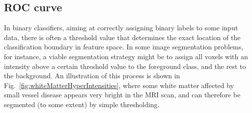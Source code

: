 \documentclass[10pt,twoside]{book}
\begin{document}
\subsection{ROC curve}

In binary classifiers, aiming at correctly assigning binary labels to some input data, there is often a threshold value that determines
the exact location of the classification boundary in feature space. In some image segmentation problems, for instance, a viable segmentation 
strategy might be to assign all voxels with an intensity above a certain threshold value to the foreground class, and the rest to the background. 
An illustration of this process is shown in Fig.~\ref{fig:whiteMatterHyperIntensities}, where some white matter affected by small vessel disease appears very bright 
in the MRI scan, and can therefore be segmented (to some extent) by simple thresholding. 
\end{document}
